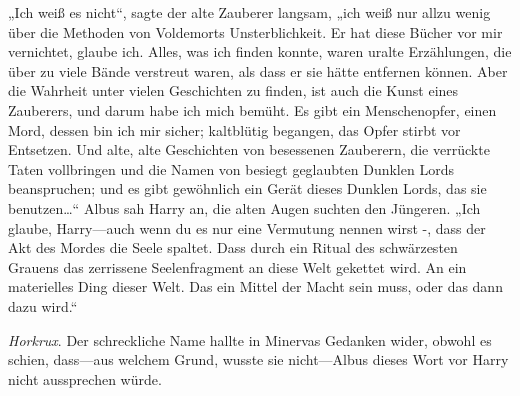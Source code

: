 „Ich weiß es nicht“, sagte der alte Zauberer langsam, „ich weiß nur allzu wenig über die Methoden von Voldemorts Unsterblichkeit. Er hat diese Bücher vor mir vernichtet, glaube ich. Alles, was ich finden konnte, waren uralte Erzählungen, die über zu viele Bände verstreut waren, als dass er sie hätte entfernen können. Aber die Wahrheit unter vielen Geschichten zu finden, ist auch die Kunst eines Zauberers, und darum habe ich mich bemüht. Es gibt ein Menschenopfer, einen Mord, dessen bin ich mir sicher; kaltblütig begangen, das Opfer stirbt vor Entsetzen. Und alte, alte Geschichten von besessenen Zauberern, die verrückte Taten vollbringen und die Namen von besiegt geglaubten Dunklen Lords beanspruchen; und es gibt gewöhnlich ein Gerät dieses Dunklen Lords, das sie benutzen…“
Albus sah Harry an, die alten Augen suchten den Jüngeren.
„Ich glaube, Harry—auch wenn du es nur eine Vermutung nennen wirst -, dass der Akt des Mordes die Seele spaltet. Dass durch ein Ritual des schwärzesten Grauens das zerrissene Seelenfragment an diese Welt gekettet wird. An ein materielles Ding dieser Welt. Das ein Mittel der Macht sein muss, oder das dann dazu wird.“

\emph{Horkrux}. Der schreckliche Name hallte in Minervas Gedanken wider, obwohl es schien, dass—aus welchem Grund, wusste sie nicht—Albus dieses Wort vor Harry nicht aussprechen würde.

